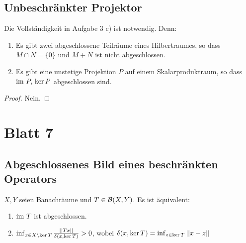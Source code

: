 \documentclass[FunkAnaSkript.tex]{subfiles}
\begin{document}
\subsection{ Unbeschränkter Projektor}
\label{B6.4}
	Die Vollständigkeit in Aufgabe 3 c) ist notwendig. Denn:
	\begin{enumerate}
		\item Es gibt zwei abgeschlossene Teilräume eines Hilbertraumes, so dass $M \cap N = \{0 \}$ und $M+N$ ist nicht abgeschlossen.
		\item Es gibt eine unstetige Projektion $P$ auf einem Skalarproduktraum, so dass $\textnormal{im } P,\, \ker P$ abgeschlossen sind.
	\end{enumerate}

	\begin{proof}
	Nein.
	\end{proof}



\newpage
\section{ Blatt 7}

\subsection{ Abgeschlossenes Bild eines beschränkten Operators}
\label{B7.1}
	$X,Y$ seien Banachräume und $T\in \mathcal{B}(X,Y)$. Es ist äquivalent:
	\begin{enumerate}
		\item $\textnormal{im } T$ ist abgeschlossen.
		\item $\inf_{x\in X\setminus \ker T} \frac{\left\lvert \left\lvert Tx \right\rvert \right\rvert}{\delta(x, \ker T )} > 0$, wobei $\delta(x, \ker T) = \inf_{z\in \ker T} \left\lvert \left\lvert x-z \right\rvert \right\rvert$
	\end{enumerate}
	
\end{document}
